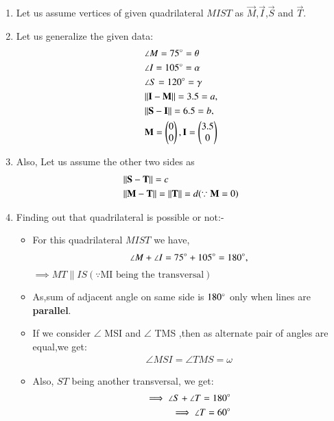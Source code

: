 \documentclass[journal,12pt,twocolumn]{IEEEtran}
\begin{document}
\begin{enumerate}
\item Let us assume vertices of given quadrilateral $MIST$ as $\vec{M}$,$\vec{I}$,$\vec{S}$ and $\vec{T}$.

\item Let us generalize the given data:
    \begin{align}
    &\angle M= 75\degree=\theta \label{eq1}
    \\
    &\angle I= 105\degree=\alpha
    \\
    &\angle S= 120\degree=\gamma \label{eq2}
    \\
    &\Vert\mathbf{I}-\mathbf{M}\rVert =3.5=a, \label{eq3}
    \\
    &\Vert\mathbf{S}-\mathbf{I}\rVert =6.5=b,\label{eq4}
    \\
    &\mathbf{M}=\begin{pmatrix}0\\0\end{pmatrix}, \mathbf{I}=\begin{pmatrix}3.5\\0\end{pmatrix}
    \end{align}
\item Also, Let us assume the other two sides as
\begin{align}
 &\Vert\mathbf{S}-\mathbf{T}\rVert=c \label{eq5}
 \\
  &\Vert\mathbf{M}-\mathbf{T}\rVert=\Vert\mathbf{T}\rVert =d \label{eq6} (\because \mathbf{M}=0)
\end{align}  
\item Finding out that quadrilateral is possible or not:-
\begin{itemize}
\item For this quadrilateral $MIST$ we have,
\begin{align}
\angle M +\angle I = 75\degree + 105\degree =180\degree,
\end{align}
$ \implies MT \parallel IS (\because \text {MI being the transversal})$
\\
\item As,sum of adjacent angle on same side is $180\degree$ only when lines are \textbf{parallel}.
\item If we consider $\angle$ MSI and $\angle$  TMS ,then as alternate pair of angles are equal,we get:
\begin{align}
\angle MSI = \angle TMS =\omega \label{eq7}
\end{align}
\item Also, $ST$ being another transversal, we get:
\begin{align}
\implies \angle S + \angle T = 180\degree 
\\
\implies \angle T = 60\degree 
\\

\end{align}
\end{itemize}
\end{enumerate}
\end{document}

